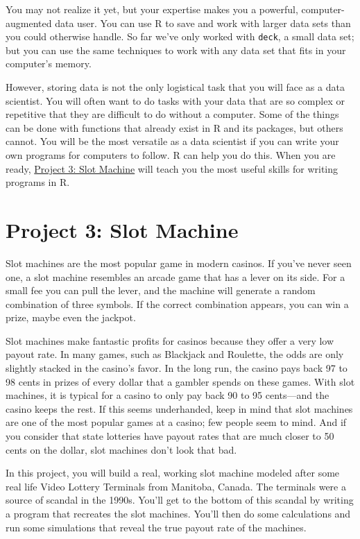 \documentclass[
  letterpaper,
  DIV=11,
  numbers=noendperiod]{scrbook}
\begin{document}
You may not realize it yet, but your expertise makes you a powerful,
computer-augmented data user. You can use R to save and work with larger
data sets than you could otherwise handle. So far we've only worked with
\texttt{deck}, a small data set; but you can use the same techniques to
work with any data set that fits in your computer's memory.

However, storing data is not the only logistical task that you will face
as a data scientist. You will often want to do tasks with your data that
are so complex or repetitive that they are difficult to do without a
computer. Some of the things can be done with functions that already
exist in R and its packages, but others cannot. You will be the most
versatile as a data scientist if you can write your own programs for
computers to follow. R can help you do this. When you are ready,
\hyperref[sec-project-slots]{Project 3: Slot Machine} will teach you the
most useful skills for writing programs in R.

\part{Project 3: Slot Machine}

Slot machines are the most popular game in modern casinos. If you've
never seen one, a slot machine resembles an arcade game that has a lever
on its side. For a small fee you can pull the lever, and the machine
will generate a random combination of three symbols. If the correct
combination appears, you can win a prize, maybe even the jackpot.

Slot machines make fantastic profits for casinos because they offer a
very low payout rate. In many games, such as Blackjack and Roulette, the
odds are only slightly stacked in the casino's favor. In the long run,
the casino pays back 97 to 98 cents in prizes of every dollar that a
gambler spends on these games. With slot machines, it is typical for a
casino to only pay back 90 to 95 cents---and the casino keeps the rest.
If this seems underhanded, keep in mind that slot machines are one of
the most popular games at a casino; few people seem to mind. And if you
consider that state lotteries have payout rates that are much closer to
50 cents on the dollar, slot machines don't look that bad.

In this project, you will build a real, working slot machine modeled
after some real life Video Lottery Terminals from Manitoba, Canada. The
terminals were a source of scandal in the 1990s. You'll get to the
bottom of this scandal by writing a program that recreates the slot
machines. You'll then do some calculations and run some simulations that
reveal the true payout rate of the machines.
\end{document}
